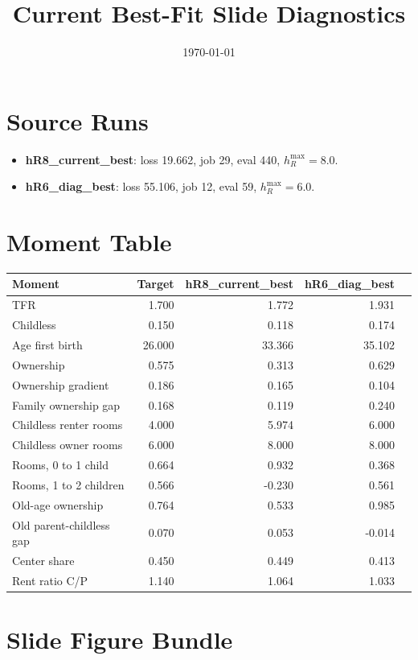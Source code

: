 \documentclass[11pt]{article}
\title{Current Best-Fit Slide Diagnostics}
\date{\today}
\begin{document}
\maketitle
\section*{Source Runs}
\begin{itemize}
\item \textbf{hR8\_current\_best}: loss 19.662, job 29, eval 440, $h_R^{\max}=8.0$.
\item \textbf{hR6\_diag\_best}: loss 55.106, job 12, eval 59, $h_R^{\max}=6.0$.
\end{itemize}
\section*{Moment Table}
\begin{table}[H]\centering\small
\begin{tabular}{lrrrr}
\toprule
Moment & Target & hR8\_current\_best & hR6\_diag\_best \\
\midrule
TFR & 1.700 & 1.772 & 1.931 \\
Childless & 0.150 & 0.118 & 0.174 \\
Age first birth & 26.000 & 33.366 & 35.102 \\
Ownership & 0.575 & 0.313 & 0.629 \\
Ownership gradient & 0.186 & 0.165 & 0.104 \\
Family ownership gap & 0.168 & 0.119 & 0.240 \\
Childless renter rooms & 4.000 & 5.974 & 6.000 \\
Childless owner rooms & 6.000 & 8.000 & 8.000 \\
Rooms, 0 to 1 child & 0.664 & 0.932 & 0.368 \\
Rooms, 1 to 2 children & 0.566 & -0.230 & 0.561 \\
Old-age ownership & 0.764 & 0.533 & 0.985 \\
Old parent-childless gap & 0.070 & 0.053 & -0.014 \\
Center share & 0.450 & 0.449 & 0.413 \\
Rent ratio C/P & 1.140 & 1.064 & 1.033 \\
\bottomrule
\end{tabular}
\end{table}
\section*{Slide Figure Bundle}
\end{document}
